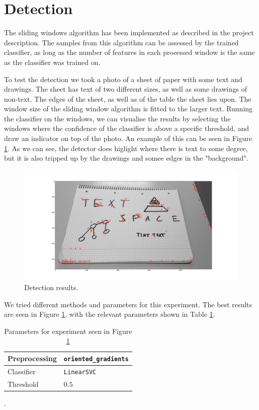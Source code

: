 \section{Detection}
The sliding windows algorithm has been implemented as described in the project
description.
The samples from this algorithm can be assessed by the trained classifier,
as long as the number of features in each processed window is the same as the classifier was trained on.

To test the detection we took a photo of a sheet of paper with some text and drawings.
The sheet has text of two different sizes, as well as some drawings of non-text.
The edges of the sheet, as well as of the table the sheet lies upon.
The window size of the sliding window algorithm is fitted to the larger text.
Running the classifier on the windows, we can visualise the results by selecting the windows where the confidence of the classifier is above a specific threshold, and draw an indicator on top of the photo.
An example of this can be seen in Figure \ref{fig:illuminati}.
As we can see, the detector does higlight where there is text to some degree,
but it is also tripped up by the drawings and somee edges in the "background".

\begin{figure}[H]
    \centering
    \includegraphics[width=\linewidth]{img/illuminati}
    \caption{Detection results.}
    \label{fig:illuminati}
\end{figure}

We tried different methods and parameters for this experiment.
The best results are seen in Figure \ref{fig:illuminati},
with the relevant parameters shown in Table \ref{tbl:illuminati}.

\begin{table}[H]
    \centering
    \begin{tabular}{l|l}
        Preprocessing   &   \texttt{oriented\_gradients}    \\\hline
        Classifier      &   \texttt{LinearSVC}              \\\hline
        Threshold       &   $0.5$
    \end{tabular}
    \caption{Parameters for experiment seen in Figure \ref{fig:illuminati}}.
    \label{tbl:illuminati}
\end{table}

